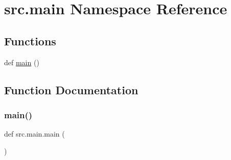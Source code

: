 \hypertarget{namespacesrc_1_1main}{}\section{src.\+main Namespace Reference}
\label{namespacesrc_1_1main}
\subsection*{Functions}
\begin{DoxyCompactItemize}
\item 
def \hyperlink{namespacesrc_1_1main_aa2ef3f8da6c115803462ed4b1529ad94}{main} ()
\end{DoxyCompactItemize}


\subsection{Function Documentation}
\mbox{\label{namespacesrc_1_1main_aa2ef3f8da6c115803462ed4b1529ad94}} 
\subsubsection{\texorpdfstring{main()}{main()}}
{\footnotesize\ttfamily def src.\+main.\+main (\begin{DoxyParamCaption}{ }\end{DoxyParamCaption})}

